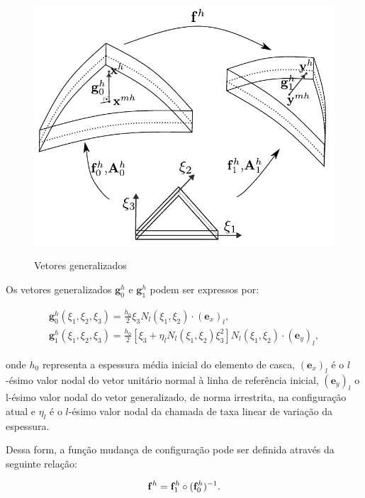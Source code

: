 \begin{figure}[!htbp]
	\caption{Vetores generalizados}
	\centering
	\includegraphics[scale=0.8,trim=0cm 0.0cm 0cm 0cm, clip=true]{Imagens/Cap4/casca_vetores_generalizados.pdf}	
	\label{fig:casca_vetores_generalizados}
\end{figure}

Os vetores generalizados $\mathbf{g}^{h}_{0}$ e $\mathbf{g}^{h}_{1}$ podem ser expressos por:

\begin{align}
\mathbf{g}^{h}_{0} (\xi_{1},\xi_{2}, \xi_{3}) = \frac{h_{0}}{2}\xi_{3} N_{l}\left(\xi_{1},\xi_{2}\right) \cdot  (\mathbf{e}_x)_l, \\
\mathbf{g}^{h}_{1} (\xi_{1},\xi_{2}, \xi_{3}) = \frac{h_{0}}{2}\left[\xi_{3} + \eta_l N_l\left(\xi_{1},\xi_{2}\right)\xi_{3}^2\right]N_{l}\left(\xi_{1},\xi_{2}\right) \cdot (\mathbf{e}_y)_l,
\end{align}

\noindent onde $h_{0}$ representa a espessura média inicial do elemento de casca, $(\mathbf{e}_x)_l$ é o $l$-ésimo valor nodal do vetor unitário normal à linha de referência inicial, $(\mathbf{e}_y)_l$ o l-ésimo valor nodal do vetor generalizado, de norma irrestrita, na configuração atual e $\eta_l$ é o $l$-ésimo valor nodal da chamada de taxa linear de variação da espessura.

Dessa form, a função mudança de configuração pode ser definida através da seguinte relação:

\begin{align}
	\mathbf{f}^{h} = \mathbf{f}^{h}_{1} \circ  (\mathbf{f}^{h}_{0})^{-1} \label{eq:eq_mud_conf}.
\end{align}

